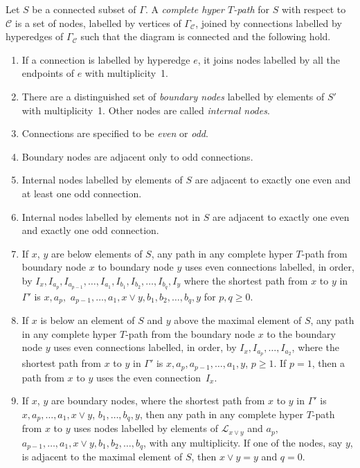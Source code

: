 \documentclass[10pt,a4paper]{amsart}
\numberwithin{equation}{section}
\begin{document}
\begin{Definition}\label{def:hyperTpath}
Let $S$ be a connected subset of $\Gamma$. A \emph{complete hyper $T$-path} for $S$ with respect to $\mathcal{C}$ is a set of nodes, labelled by vertices of $\Gamma_{\mathcal{C}}$, joined by connections labelled by hyperedges of $\Gamma_{\mathcal{C}}$ such that the diagram is connected and the following hold.
\begin{enumerate}\itemsep=0pt
 \item If a connection is labelled by hyperedge $e$, it joins nodes labelled by all the endpoints of $e$ with multiplicity~1.
 \item There are a distinguished set of \emph{boundary nodes} labelled by elements of $S'$ with multiplicity~1. Other nodes are called \emph{internal nodes}.
 \item Connections are specified to be \emph{even} or \emph{odd}.
 \item Boundary nodes are adjacent only to odd connections.
 \item Internal nodes labelled by elements of $S$ are adjacent to exactly one even and at least one odd connection.
 \item Internal nodes labelled by elements not in $S$ are adjacent to exactly one even and exactly one odd connection.
 \item If $x$, $y$ are below elements of $S$, any path in any complete hyper $T$-path from boundary node $x$ to boundary node $y$ uses even connections labelled, in order, by $I_x,I_{a_p},I_{a_{p-1}},\dots,I_{a_1},I_{b_1},\allowbreak I_{b_2},\dots,I_{b_q},I_y$ where the shortest path from $x$ to $y$ in $\Gamma'$ is $x,a_p,$ $a_{p-1},\dots,a_1,x\vee y,b_1,b_2,\dots,\allowbreak b_q,y$ for $p,q \geq 0$.
 \item If $x$ is below an element of $S$ and $y$ above the maximal element of $S$, any path in any complete hyper $T$-path from the boundary node $x$ to the boundary node $y$ uses even connections labelled, in order, by $I_x,I_{a_p},\ldots,I_{a_2}$, where the shortest path from $x$ to $y$ in $\Gamma'$ is $x,a_p,a_{p-1},\ldots,a_1,y$, $p \geq 1$. If $p = 1$, then a path from $x$ to $y$ uses the even connec\-tion~$I_x$.
 \item If $x$, $y$ are boundary nodes, where the shortest path from $x$ to $y$ in $\Gamma'$ is $x,a_p,\ldots,a_1,x\vee y$, $b_1, \ldots,b_q,y$, then any path in any complete hyper $T$-path from $x$ to $y$ uses nodes labelled by elements of $\mathcal{L}_{x\vee y}$ and $a_p,$ $a_{p-1},\dots,a_1,x\vee y,b_1,b_2,\dots,b_q$, with any multiplicity. If one of the nodes, say $y$, is adjacent to the maximal element of $S$, then $x \vee y = y$ and $q = 0$.
\end{enumerate}
\end{Definition}
\end{document}
